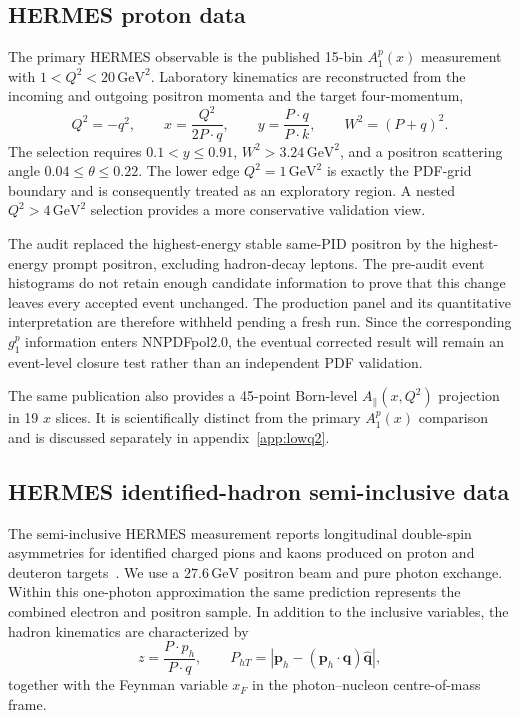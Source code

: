 \documentclass[11pt,a4paper]{article}
\newcommand{\ap}{A_{\parallel}}
\newcommand{\GeV}{\ensuremath{\,\mathrm{GeV}}}
\begin{document}
\subsection{HERMES proton data}

The primary HERMES observable is the published 15-bin $A_1^p(x)$
measurement with $1<Q^2<20\,\mathrm{GeV}^2$.  Laboratory kinematics are
reconstructed from the incoming and outgoing positron momenta and the target
four-momentum,
\begin{equation}
 Q^2=-q^2,\qquad
 x=\frac{Q^2}{2P\mathbin{\cdot}q},\qquad
 y=\frac{P\mathbin{\cdot}q}{P\mathbin{\cdot}k},\qquad
 W^2=(P+q)^2 .
\end{equation}
The selection requires $0.1<y\leq0.91$,
$W^2>3.24\,\mathrm{GeV}^2$, and a positron scattering angle
$0.04\leq\theta\leq0.22$.  The lower edge $Q^2=1\,\mathrm{GeV}^2$
is exactly the PDF-grid boundary and is consequently treated as an
exploratory region.  A nested $Q^2>4\,\mathrm{GeV}^2$ selection provides a
more conservative validation view.

The audit replaced the highest-energy stable same-PID positron by the
highest-energy prompt positron, excluding hadron-decay leptons.  The
pre-audit event histograms do not retain enough candidate information to
prove that this change leaves every accepted event unchanged.  The production
panel and its quantitative interpretation are therefore withheld pending a
fresh run.  Since the corresponding $g_1^p$ information enters NNPDFpol2.0,
the eventual corrected result will remain an event-level closure test rather
than an independent PDF validation.

The same publication also provides a 45-point Born-level
$\ap(x,Q^2)$ projection in 19 $x$ slices.  It is scientifically distinct
from the primary $A_1^p(x)$ comparison and is discussed separately in
appendix~\ref{app:lowq2}.

\FloatBarrier
\subsection{HERMES identified-hadron semi-inclusive data}
\label{sec:hermes-sidis}

The semi-inclusive HERMES measurement reports longitudinal double-spin
asymmetries for identified charged pions and kaons produced on proton and
deuteron targets~\cite{HERMES:2019sidis}.  We use a $27.6\GeV$ positron beam
and pure photon exchange.  Within this one-photon approximation the same
prediction represents the combined electron and positron sample.  In addition
to the inclusive variables, the hadron kinematics are characterized by
\begin{equation}
 z=\frac{P\mathbin{\cdot}p_h}{P\mathbin{\cdot}q},
 \qquad P_{hT}=|\boldsymbol p_h-(\boldsymbol p_h\mathbin{\cdot}
 \hat{\boldsymbol q})\hat{\boldsymbol q}|,
\end{equation}
together with the Feynman variable $x_F$ in the photon--nucleon
centre-of-mass frame.
\end{document}
